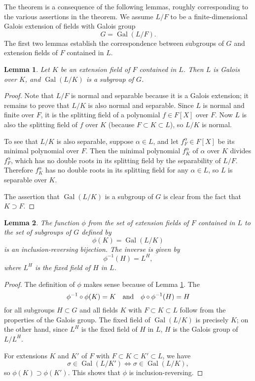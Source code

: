 \documentclass[12pt]{article}
\DeclareMathOperator{\Gal}{Gal}
\newtheorem{lemma}{Lemma}
\begin{document}
The theorem is a consequence of the following lemmas, roughly
corresponding to the various assertions in the theorem.  We assume
$L/F$ to be a finite-dimensional Galois extension of fields with
Galois group
\[
G=\Gal(L/F).
\]
The first two lemmas establish the correspondence between subgroups of
$G$ and extension fields of $F$ contained in $L$.

\begin{lemma}
\label{lemma1}
Let $K$ be an extension field of $F$ contained in $L$.  Then $L$ is
Galois over $K$, and $\Gal(L/K)$ is a subgroup of $G$.
\end{lemma}

\begin{proof}
Note that $L/F$ is normal and separable because it is a Galois
extension; it remains to prove that $L/K$ is also normal and
separable.  Since $L$ is normal and finite over $F$, it is the
splitting field of a polynomial $f\in F[X]$ over $F$.  Now $L$ is also
the splitting field of $f$ over $K$ (because $F\subset K\subset L$),
so $L/K$ is normal.

To see that $L/K$ is also separable, suppose $\alpha\in L$, and let
$f^\alpha_F\in F[X]$ be its minimal polynomial over $F$.  Then the
minimal polynomial $f^\alpha_K$ of $\alpha$ over $K$ divides
$f^\alpha_F$, which has no double roots in its splitting field by the
separability of $L/F$.  Therefore $f^\alpha_K$ has no double roots in
its splitting field for any $\alpha\in L$, so $L$ is separable over
$K$.

The assertion that $\Gal(L/K)$ is a subgroup of $G$ is clear from the
fact that $K\supset F$.
\end{proof}

\begin{lemma}
\label{lemma2}
The function $\phi$ from the set of extension fields of $F$ contained
in $L$ to the set of subgroups of $G$ defined by
\[
\phi(K)=\Gal(L/K)
\]
is an inclusion-reversing bijection.  The inverse is given by
\[
\phi^{-1}(H)=L^H,
\]
where $L^H$ is the fixed field of $H$ in $L$.
\end{lemma}

\begin{proof}
The definition of $\phi$ makes sense because of Lemma \ref{lemma1}.
The 
\[
\phi^{-1}\circ\phi(K)=K\quad\hbox{and}\quad
\phi\circ\phi^{-1}(H)=H
\]
for all subgroups $H\subset G$ and all fields $K$ with $F\subset
K\subset L$ follow from the properties of the Galois group.  The fixed
field of $\Gal(L/K)$ is precisely $K$; on the other hand, since $L^H$
is the fixed field of $H$ in $L$, $H$ is the Galois group of $L/L^H$.

For extensions $K$ and $K'$ of $F$ with $F\subset K\subset K'\subset
L$, we have
\[
\sigma\in\Gal(L/K')\iff\sigma\in\Gal(L/K),
\]
so $\phi(K)\supset\phi(K')$.  This shows that $\phi$ is
inclusion-reversing.
\end{proof}
\end{document}
